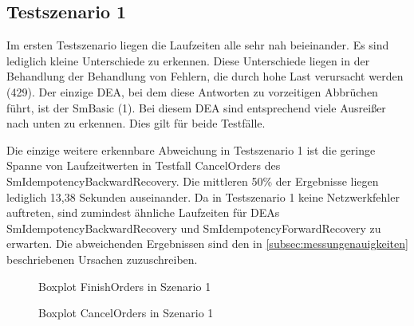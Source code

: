 \subsection{Testszenario 1}
Im ersten Testszenario liegen die Laufzeiten alle sehr nah beieinander. Es sind lediglich kleine Unterschiede zu erkennen. Diese Unterschiede liegen in der Behandlung der Behandlung von Fehlern, die durch hohe Last verursacht werden (429). Der einzige DEA, bei dem diese Antworten zu vorzeitigen Abbrüchen führt, ist der SmBasic (1). Bei diesem DEA sind entsprechend viele Ausreißer nach unten zu erkennen. Dies gilt für beide Testfälle.

Die einzige weitere erkennbare Abweichung in Testszenario 1 ist die geringe Spanne von Laufzeitwerten in Testfall CancelOrders des SmIdempotencyBackwardRecovery. Die mittleren 50\% der Ergebnisse liegen lediglich 13,38 Sekunden auseinander. Da in Testszenario 1 keine Netzwerkfehler auftreten, sind zumindest ähnliche Laufzeiten für DEAs SmIdempotencyBackwardRecovery und SmIdempotencyForwardRecovery zu erwarten. Die abweichenden Ergebnissen sind den in \cref{subsec:messungenauigkeiten} beschriebenen Ursachen zuzuschreiben.

\begin{figure}[!htbp]
	\begin{minipage}{.45\textwidth}
		
		\caption{Boxplot FinishOrders in Szenario 1}
		\label{fig:boxplot_finishorders_scenario1}
	\end{minipage}\hspace{\fill}%
	\begin{minipage}{.45\textwidth}
		
		\caption{Boxplot CancelOrders in Szenario 1}
		\label{fig:boxplot_cancelorders_scenario1}
	\end{minipage}
\end{figure}
\FloatBarrier
